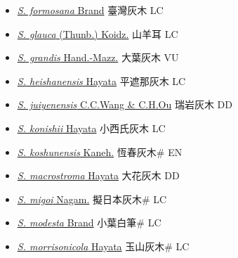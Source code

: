 \begin{itemize}
\begin{itemize}
        \item[] \href{http://www.theplantlist.org/tpl1.1/search?q=Symplocos+formosana}{\textit{S. formosana} Brand}   臺灣灰木 LC
        \item[] \href{http://www.theplantlist.org/tpl1.1/search?q=Symplocos+glauca}{\textit{S. glauca} (Thunb.) Koidz.}   山羊耳 LC
        \item[] \href{http://www.theplantlist.org/tpl1.1/search?q=Symplocos+grandis}{\textit{S. grandis} Hand.-Mazz.}   大葉灰木 VU
        \item[] \href{http://www.theplantlist.org/tpl1.1/search?q=Symplocos+heishanensis}{\textit{S. heishanensis} Hayata}   平遮那灰木 LC
        \item[] \href{http://www.theplantlist.org/tpl1.1/search?q=Symplocos+juiyenensis}{\textit{S. juiyenensis} C.C.Wang \& C.H.Ou}   瑞岩灰木 DD
        \item[] \href{http://www.theplantlist.org/tpl1.1/search?q=Symplocos+konishii}{\textit{S. konishii} Hayata}   小西氏灰木 LC
        \item[] \href{http://www.theplantlist.org/tpl1.1/search?q=Symplocos+koshunensis}{\textit{S. koshunensis} Kaneh.}   恆春灰木\# EN
        \item[] \href{http://www.theplantlist.org/tpl1.1/search?q=Symplocos+macrostroma}{\textit{S. macrostroma} Hayata}   大花灰木 DD
        \item[] \href{http://www.theplantlist.org/tpl1.1/search?q=Symplocos+migoi}{\textit{S. migoi} Nagam.}   擬日本灰木\# LC
        \item[] \href{http://www.theplantlist.org/tpl1.1/search?q=Symplocos+modesta}{\textit{S. modesta} Brand}   小葉白筆\# LC
        \item[] \href{http://www.theplantlist.org/tpl1.1/search?q=Symplocos+morrisonicola}{\textit{S. morrisonicola} Hayata}   玉山灰木\# LC

\end{itemize}
\end{itemize}
